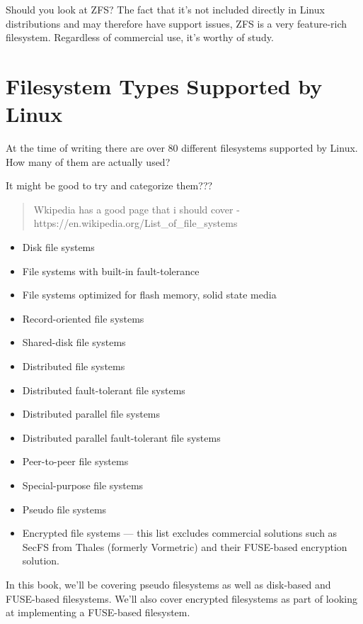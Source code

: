 \noindent
Should you look at ZFS? The fact that it's not included directly in Linux distributions and may therefore have support issues, ZFS is a very feature-rich filesystem. Regardless of commercial use, it's worthy of study.


\section{Filesystem Types Supported by Linux}

At the time of writing there are over 80 different filesystems supported by Linux. How many of them are actually used? 

It might be good to try and categorize them???

\begin{quote}
Wkipedia has a good page that i should cover - https://en.wikipedia.org/List\_of\_file\_systems
\end{quote}

\begin{itemize}
	\item Disk file systems
	\item File systems with built-in fault-tolerance
	\item File systems optimized for flash memory, solid state media
	\item Record-oriented file systems
	\item Shared-disk file systems
	\item Distributed file systems
	\item Distributed fault-tolerant file systems
	\item Distributed parallel file systems
	\item Distributed parallel fault-tolerant file systems
	\item Peer-to-peer file systems
	\item Special-purpose file systems
	\item Pseudo file systems
	\item Encrypted file systems --- this list excludes commercial solutions such as SecFS from 
		Thales (formerly Vormetric) and their FUSE-based encryption solution.
\end{itemize}

\noindent
In this book, we'll be covering pseudo filesystems as well as disk-based and FUSE-based filesystems. We'll also cover encrypted filesystems as part of looking at implementing a FUSE-based filesystem. 

